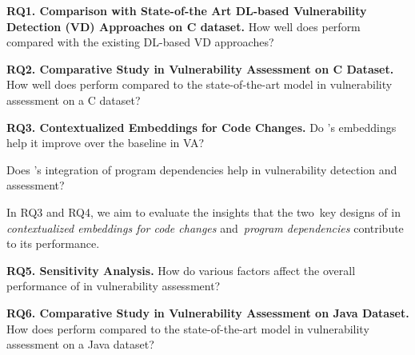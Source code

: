 

\vspace{1pt}
\noindent\textbf{RQ1. Comparison with State-of-the Art DL-based Vulnerability
Detection (VD) Approaches on C dataset.} How well does {\tool} perform
compared with the existing DL-based VD approaches?

\vspace{1pt}
\noindent\textbf{RQ2. Comparative Study in Vulnerability Assessment on C
  Dataset.} How well does {\tool} perform compared to the
state-of-the-art model in vulnerability assessment on a C dataset?


\noindent\textbf{RQ3. Contextualized Embeddings for Code Changes.} Do {\tool}'s embeddings help it improve over the
baseline in VA?


 Does {\tool}'s integration
of program dependencies help in vulnerability detection and
assessment?

In RQ3 and RQ4, we aim to evaluate the insights that the two~key
  designs of {\tool} in {\em contextualized embeddings for code
  changes} and~{\em program dependencies} contribute to its performance.


\noindent\textbf{RQ5. Sensitivity Analysis.} How do various factors
affect the overall performance of {\tool} in vulnerability assessment?

\vspace{1pt}
\noindent\textbf{RQ6. Comparative Study in Vulnerability Assessment on Java
  Dataset.} How does {\tool} perform compared to the
state-of-the-art model in vulnerability assessment on a Java dataset?
